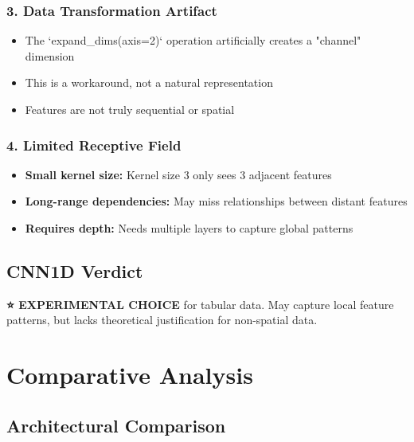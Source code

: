 \documentclass[12pt]{article}
\begin{document}
\subsubsection{3. Data Transformation Artifact}
\begin{itemize}
    \item The `expand_dims(axis=2)` operation artificially creates a "channel" dimension
    \item This is a workaround, not a natural representation
    \item Features are not truly sequential or spatial
\end{itemize}

\subsubsection{4. Limited Receptive Field}
\begin{itemize}
    \item \textbf{Small kernel size:} Kernel size 3 only sees 3 adjacent features
    \item \textbf{Long-range dependencies:} May miss relationships between distant features
    \item \textbf{Requires depth:} Needs multiple layers to capture global patterns
\end{itemize}

\subsection{CNN1D Verdict}

\textbf{⭐ EXPERIMENTAL CHOICE} for tabular data. May capture local feature patterns, but lacks theoretical justification for non-spatial data.

\section{Comparative Analysis}

\subsection{Architectural Comparison}
\end{document}
